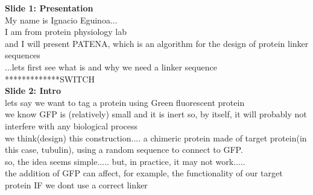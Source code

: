 \documentclass[a4paper,10pt]{article}
\begin{document}

\textbf{Slide 1: Presentation}\\
My name is Ignacio Eguinoa...\\
I am from protein physiology lab\\
and I will present PATENA, which is an algorithm for the design of protein linker sequences\\
...lets first see what is and why we need a linker sequence *************SWITCH \\



\textbf{Slide 2: Intro}\\
lets say we want to tag a protein using Green fluorescent protein\\ %
we know GFP is (relatively) small and it is inert so, by itself, it will probably not interfere with any biological process\\
we think(design) this construction.... a chimeric protein made of target protein(in this case, tubulin), using a random sequence to connect to GFP.\\
so, the idea seems simple..... but, in practice, it may not work.....\\
the addition of GFP can affect, for example, the functionality of our target protein IF we dont use a correct linker \\
\end{document}
